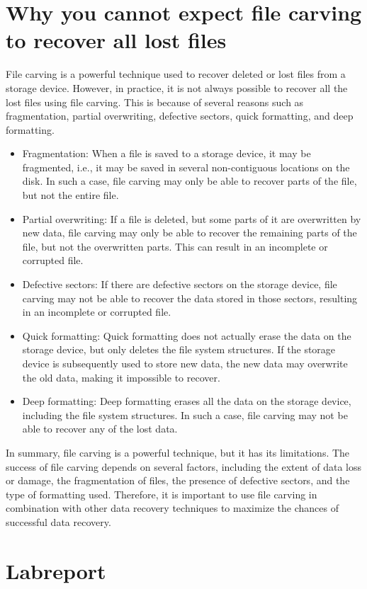 \documentclass{scrreprt}
\begin{document}
\section{Why you cannot expect file carving to recover all lost files}
File carving is a powerful technique used to recover deleted or lost files from a storage device. However, in practice, it is not always possible to recover all the lost files using file carving. This is because of several reasons such as fragmentation, partial overwriting, defective sectors, quick formatting, and deep formatting.
\begin{itemize}
\item Fragmentation: When a file is saved to a storage device, it may be fragmented, i.e., it may be saved in several non-contiguous locations on the disk. In such a case, file carving may only be able to recover parts of the file, but not the entire file.
\item Partial overwriting: If a file is deleted, but some parts of it are overwritten by new data, file carving may only be able to recover the remaining parts of the file, but not the overwritten parts. This can result in an incomplete or corrupted file.
\item Defective sectors: If there are defective sectors on the storage device, file carving may not be able to recover the data stored in those sectors, resulting in an incomplete or corrupted file.
\item Quick formatting: Quick formatting does not actually erase the data on the storage device, but only deletes the file system structures. If the storage device is subsequently used to store new data, the new data may overwrite the old data, making it impossible to recover.
\item Deep formatting: Deep formatting erases all the data on the storage device, including the file system structures. In such a case, file carving may not be able to recover any of the lost data.
\end{itemize}
In summary, file carving is a powerful technique, but it has its limitations. The success of file carving depends on several factors, including the extent of data loss or damage, the fragmentation of files, the presence of defective sectors, and the type of formatting used. Therefore, it is important to use file carving in combination with other data recovery techniques to maximize the chances of successful data recovery.
\section{Labreport}
\end{document}

